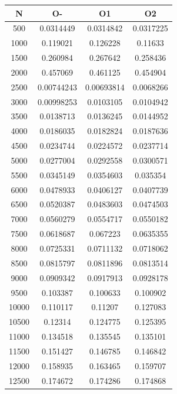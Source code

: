 \begin{center}
\begin{tabular}{| c | c | c | c |}
\hline
\textbf{N} & \textbf{O-} & \textbf{O1} & \textbf{O2} \\ \hline
500 & 0.0314449 & 0.0314842 & 0.0317225 \\ \hline
1000 & 0.119021 & 0.126228 & 0.11633 \\ \hline
1500 & 0.260984 & 0.267642 & 0.258436 \\ \hline
2000 & 0.457069 & 0.461125 & 0.454904 \\ \hline
2500 & 0.00744243 & 0.00693814 & 0.0068266 \\ \hline
3000 & 0.00998253 & 0.0103105 & 0.0104942 \\ \hline
3500 & 0.0138713 & 0.0136245 & 0.0144952 \\ \hline
4000 & 0.0186035 & 0.0182824 & 0.0187636 \\ \hline
4500 & 0.0234744 & 0.0224572 & 0.0237714 \\ \hline
5000 & 0.0277004 & 0.0292558 & 0.0300571 \\ \hline
5500 & 0.0345149 & 0.0354603 & 0.035354 \\ \hline
6000 & 0.0478933 & 0.0406127 & 0.0407739 \\ \hline
6500 & 0.0520387 & 0.0483603 & 0.0474503 \\ \hline
7000 & 0.0560279 & 0.0554717 & 0.0550182 \\ \hline
7500 & 0.0618687 & 0.067223 & 0.0635355 \\ \hline
8000 & 0.0725331 & 0.0711132 & 0.0718062 \\ \hline
8500 & 0.0815797 & 0.0811896 & 0.0813514 \\ \hline
9000 & 0.0909342 & 0.0917913 & 0.0928178 \\ \hline
9500 & 0.103387 & 0.100633 & 0.100902 \\ \hline
10000 & 0.110117 & 0.11207 & 0.127083 \\ \hline
10500 & 0.12314 & 0.124775 & 0.125395 \\ \hline
11000 & 0.134518 & 0.135545 & 0.135101 \\ \hline
11500 & 0.151427 & 0.146785 & 0.146842 \\ \hline
12000 & 0.158935 & 0.163465 & 0.159707 \\ \hline
12500 & 0.174672 & 0.174286 & 0.174868 \\ \hline
\hline
\end{tabular}
\end{center}
